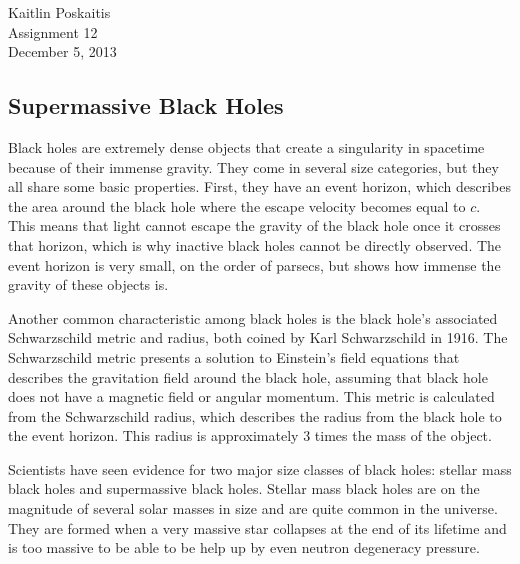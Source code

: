 \documentclass[12pt]{article}
\begin{document}
\noindent Kaitlin Poskaitis\\
Assignment 12\\
December 5, 2013
\begin{center}
    \section*{Supermassive Black Holes}
\end{center}

Black holes are extremely dense objects that create a singularity in spacetime
because of their immense gravity.  They come in several size categories, but
they all share some basic properties.  First, they have an event horizon, which
describes the area around the black hole where the escape velocity becomes equal
to $c$.  This means that light cannot escape the gravity of the black hole once
it crosses that horizon, which is why inactive black holes cannot be directly
observed.  The event horizon is very small, on the order of parsecs, but shows
how immense the gravity of these objects is.

Another common characteristic among black holes is the black hole's associated
Schwarzschild metric and radius, both coined by Karl Schwarzschild in 1916.
The Schwarzschild metric presents a solution
to Einstein's field equations that describes the gravitation field around the
black hole, assuming that black hole does not have a magnetic field or angular
momentum.  This metric is calculated from the Schwarzschild radius, which
describes the radius from the black hole to the event horizon.  This radius is
approximately 3 times the mass of the object.

Scientists have seen evidence for two major size classes of black holes:
stellar mass black holes and supermassive black holes.  Stellar mass black holes
are on the magnitude of several solar masses in size and are quite common in the
universe.  They are formed when a very massive star collapses at the end of its
lifetime and is too massive to be able to be help up by even neutron degeneracy
pressure.
\end{document}

